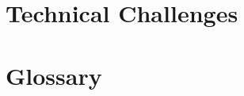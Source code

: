 \documentclass{article}
\begin{document}

\section{Technical Challenges}


\section{Glossary}



\newpage

\printbibliography
\end{document}
